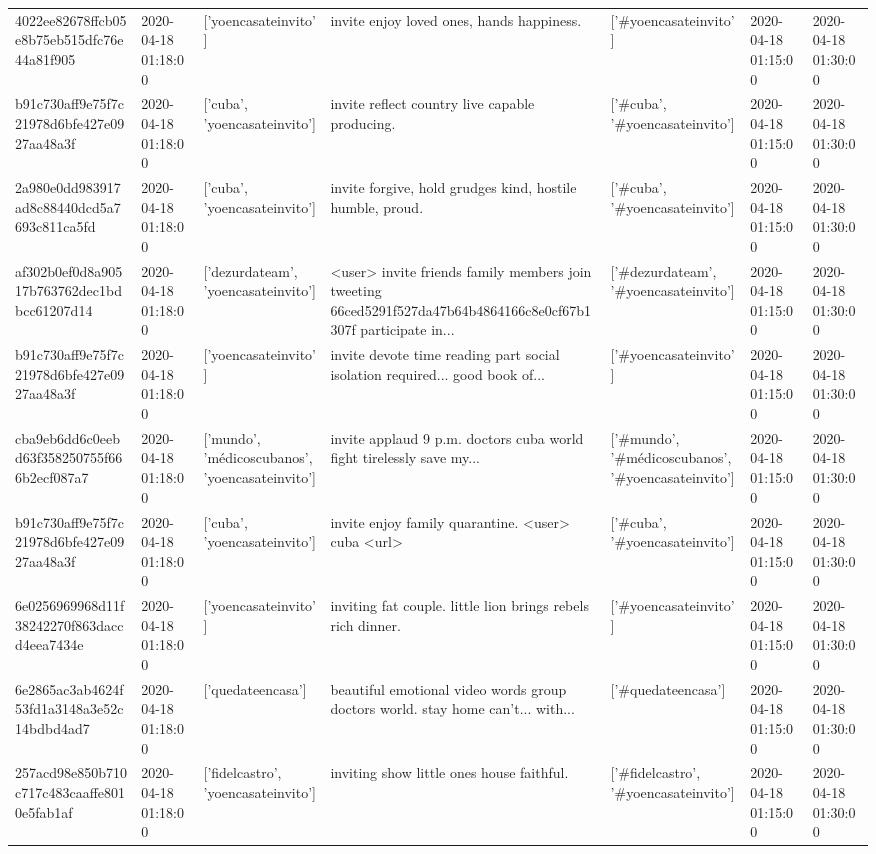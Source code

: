 \begin{tabular}{lllllll}
4022ee82678ffcb05e8b75eb515dfc76e44a81f905 & 2020-04-18 01:18:00 & ['yoencasateinvito'] & invite enjoy loved ones, hands happiness. & ['#yoencasateinvito'] & 2020-04-18 01:15:00 & 2020-04-18 01:30:00 \\
b91c730aff9e75f7c21978d6bfe427e0927aa48a3f & 2020-04-18 01:18:00 & ['cuba', 'yoencasateinvito'] & invite reflect country live capable producing. & ['#cuba', '#yoencasateinvito'] & 2020-04-18 01:15:00 & 2020-04-18 01:30:00 \\
2a980e0dd983917ad8c88440dcd5a7693c811ca5fd & 2020-04-18 01:18:00 & ['cuba', 'yoencasateinvito'] & invite forgive, hold grudges kind, hostile humble, proud. & ['#cuba', '#yoencasateinvito'] & 2020-04-18 01:15:00 & 2020-04-18 01:30:00 \\
af302b0ef0d8a90517b763762dec1bdbcc61207d14 & 2020-04-18 01:18:00 & ['dezurdateam', 'yoencasateinvito'] & <user> invite friends family members join tweeting 66ced5291f527da47b64b4864166c8e0cf67b1307f participate in... & ['#dezurdateam', '#yoencasateinvito'] & 2020-04-18 01:15:00 & 2020-04-18 01:30:00 \\
b91c730aff9e75f7c21978d6bfe427e0927aa48a3f & 2020-04-18 01:18:00 & ['yoencasateinvito'] & invite devote time reading part social isolation required... good book of... & ['#yoencasateinvito'] & 2020-04-18 01:15:00 & 2020-04-18 01:30:00 \\
cba9eb6dd6c0eebd63f358250755f666b2ecf087a7 & 2020-04-18 01:18:00 & ['mundo', 'médicoscubanos', 'yoencasateinvito'] & invite applaud 9 p.m. doctors cuba world fight tirelessly save my... & ['#mundo', '#médicoscubanos', '#yoencasateinvito'] & 2020-04-18 01:15:00 & 2020-04-18 01:30:00 \\
b91c730aff9e75f7c21978d6bfe427e0927aa48a3f & 2020-04-18 01:18:00 & ['cuba', 'yoencasateinvito'] & invite enjoy family quarantine. <user> cuba <url> & ['#cuba', '#yoencasateinvito'] & 2020-04-18 01:15:00 & 2020-04-18 01:30:00 \\
6e0256969968d11f38242270f863daccd4eea7434e & 2020-04-18 01:18:00 & ['yoencasateinvito'] & inviting fat couple. little lion brings rebels rich dinner. & ['#yoencasateinvito'] & 2020-04-18 01:15:00 & 2020-04-18 01:30:00 \\
6e2865ac3ab4624f53fd1a3148a3e52c14bdbd4ad7 & 2020-04-18 01:18:00 & ['quedateencasa'] & beautiful emotional video words group doctors world. stay home can't... with... & ['#quedateencasa'] & 2020-04-18 01:15:00 & 2020-04-18 01:30:00 \\
257acd98e850b710c717c483caaffe8010e5fab1af & 2020-04-18 01:18:00 & ['fidelcastro', 'yoencasateinvito'] & inviting show little ones house faithful. & ['#fidelcastro', '#yoencasateinvito'] & 2020-04-18 01:15:00 & 2020-04-18 01:30:00 \\

\end{tabular}
